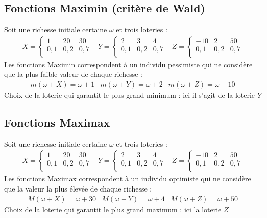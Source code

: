 \documentclass[a4paper, 12pt]{report}
\begin{document}
\subsection{Fonctions Maximin (critère de Wald)}
Soit une richesse initiale certaine $\omega$ et trois loteries :
$$
\begin{matrix}
	X=\left\{\begin{matrix}
		1 & 20 & 30 \\
		0,1 & 0,2 & 0,7 \\
	\end{matrix}\right. & Y=\left\{\begin{matrix}
		2 & 3 & 4 \\
		0,1 & 0,2 & 0,7 \\
	\end{matrix}\right. & Z=\left\{\begin{matrix}
		-10 & 2 & 50 \\
		0,1 & 0,2 & 0,7 \\
	\end{matrix}\right.
\end{matrix}
$$
Les fonctions Maximin correspondent à un individu pessimiste qui ne considère que la plus faible valeur de chaque richesse :
$$
\begin{matrix}
	m(\omega+X)=\omega+1 & m(\omega+Y)=\omega+2 & m(\omega+Z)=\omega-10
\end{matrix}
$$
Choix de la loterie qui garantit le plus grand minimum : ici il s'agit de la loterie $Y$

\subsection{Fonctions Maximax}


Soit une richesse initiale certaine $\omega$ et trois loteries :
$$
\begin{matrix}
	X=\left\{\begin{matrix}
		1 & 20 & 30 \\
		0,1 & 0,2 & 0,7 \\
	\end{matrix}\right. & Y=\left\{\begin{matrix}
		2 & 3 & 4 \\
		0,1 & 0,2 & 0,7 \\
	\end{matrix}\right. & Z=\left\{\begin{matrix}
		-10 & 2 & 50 \\
		0,1 & 0,2 & 0,7 \\
	\end{matrix}\right.
\end{matrix}
$$
Les fonctions Maximax correspondent à un individu optimiste qui ne considère que la valeur la plus élevée de chaque richesse :
$$
\begin{matrix}
	M(\omega+X)=\omega+30 & M(\omega+Y)=\omega+4 & M(\omega+Z)=\omega+50
\end{matrix}
$$
Choix de la loterie qui garantit le plus grand maximum : ici la loterie $Z$
\end{document}
